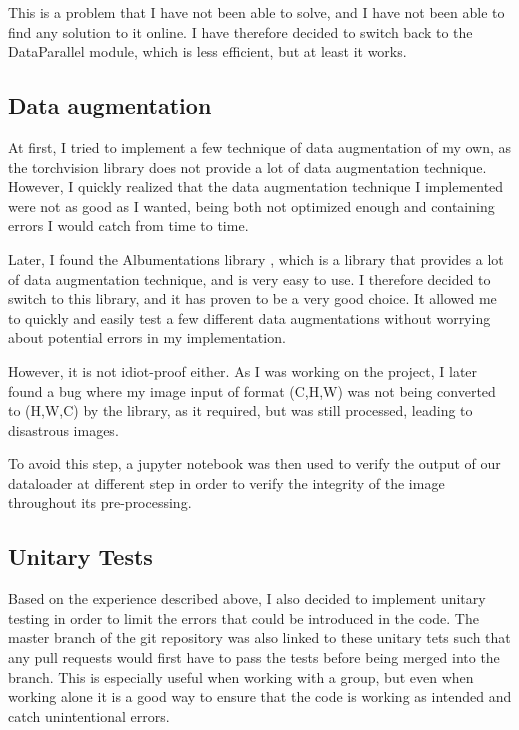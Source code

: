 \documentclass[11pt]{article}
\begin{document}
        This is a problem that I have not been able to solve, and I have not been able to find any solution to it online. I have therefore decided to switch back to the DataParallel module, which is less efficient, but at least it works.


    \subsection{Data augmentation}


        At first, I tried to implement a few technique of data augmentation of my own, as the torchvision library does not provide a lot of data augmentation technique.
        However, I quickly realized that the data augmentation technique I implemented were not as good as I wanted, being both not optimized enough and containing errors I would catch from time to time.

        Later, I found the Albumentations library \cite{albumentations}, which is a library that provides a lot of data augmentation technique, and is very easy to use. I therefore decided to switch to this library, and it has proven to be a very good choice.
        It allowed me to quickly and easily test a few different data augmentations without worrying about potential errors in my implementation.

        However, it is not idiot-proof either. As I was working on the project, I later found a bug where my image input of format (C,H,W) was not being converted to (H,W,C) by the library, as it required, but was still processed, leading to disastrous images.

        To avoid this step, a jupyter notebook was then used to verify the output of our dataloader at different step in order to verify the integrity of the image
        throughout its pre-processing.

    \subsection{Unitary Tests}

            Based on the experience described above, I also decided to implement unitary testing in order to limit the errors
            that could be introduced in the code. The master branch of the git repository was also linked to these unitary tets such that
            any pull requests would first have to pass the tests before being merged into the branch. This is especially useful when working with a group,
            but even when working alone it is a good way to ensure that the code is working as intended and catch unintentional errors.
\end{document}
